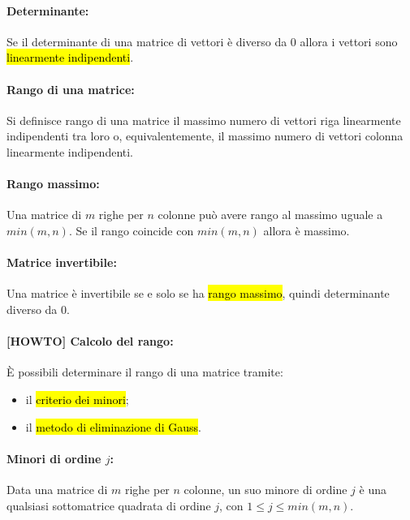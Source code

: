 \documentclass[a4paper]{article}
\begin{document}
        \paragraph{Determinante:}
        Se il determinante di una matrice di vettori \`{e} diverso da $0$ allora i vettori sono \hl{linearmente indipendenti}.

        \paragraph{Rango di una matrice:}
        Si definisce rango di una matrice il massimo numero di vettori riga linearmente indipendenti tra loro o, equivalentemente, il massimo numero di vettori colonna linearmente indipendenti.

        \paragraph{Rango massimo:}
        Una matrice di $m$ righe per $n$ colonne pu\`{o} avere rango al massimo uguale a $min(m, n)$.
        Se il rango coincide con $min(m, n)$ allora \`{e} massimo.

        \paragraph{Matrice invertibile:}
        Una matrice \`{e} invertibile se e solo se ha \hl{rango massimo}, quindi determinante diverso da $0$.

        \paragraph{[HOWTO] Calcolo del rango:}
         \`{E} possibili determinare il rango di una matrice tramite:
        \begin{itemize}
                \item il \hl{criterio dei minori};
                \item il \hl{metodo di eliminazione di Gauss}.
        \end{itemize}

        \paragraph{Minori di ordine $j$:}
        Data una matrice di $m$ righe per $n$ colonne, un suo minore di ordine $j$ \`{e} una qualsiasi sottomatrice quadrata di ordine $j$, con $1 \leq j \leq min(m, n)$.
\end{document}
